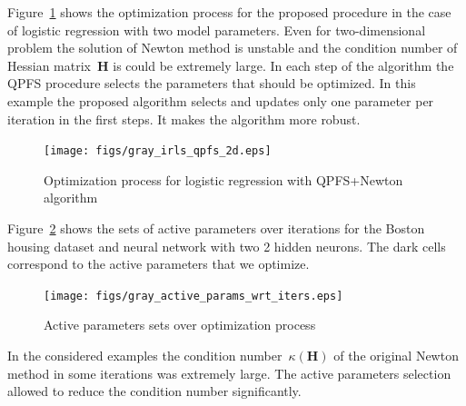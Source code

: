 \documentclass[
11pt,%
tightenlines,%
twoside,%
onecolumn,%
nofloats,%
nobibnotes,%
nofootinbib,%
superscriptaddress,%
noshowpacs,%
centertags]%
{revtex4}
\newcommand{\bH}{\mathbf{H}}
\begin{document}
Figure~\ref{fig:irls_qpfs_2d} shows the optimization process for the proposed procedure in the case of logistic regression with two model parameters. 
Even for two-dimensional problem the solution of Newton method is unstable and the condition number of Hessian matrix~$\bH$ is could be extremely large. 
In each step of the algorithm the QPFS procedure selects the parameters that should be optimized. 
In this example the proposed algorithm selects and updates only one parameter per iteration in the first steps. 
It makes the algorithm more robust.
\begin{figure}[!h]
	\setcaptionmargin{5mm}
	\onelinecaptionsfalse %
	\centering
	\texttt{[image: figs/gray\_irls\_qpfs\_2d.eps]}	 
	\caption{Optimization process for logistic regression with QPFS+Newton algorithm}
	\label{fig:irls_qpfs_2d}
\end{figure}

Figure~\ref{fig:active_params_wrt_iters} shows the sets of active parameters over iterations for the Boston housing dataset and neural network with two 2 hidden neurons. 
The dark cells correspond to the active parameters that we optimize.

\begin{figure}[!h]
	\setcaptionmargin{5mm}
	\onelinecaptionsfalse %
	\centering
	\texttt{[image: figs/gray\_active\_params\_wrt\_iters.eps]}	
	\caption{Active parameters sets over optimization process}
	\label{fig:active_params_wrt_iters}
\end{figure}

In the considered examples the condition number~$\kappa (\bH)$ of the original Newton method in some iterations was extremely large. 
The active parameters selection allowed to reduce the condition number significantly. 
\end{document}
